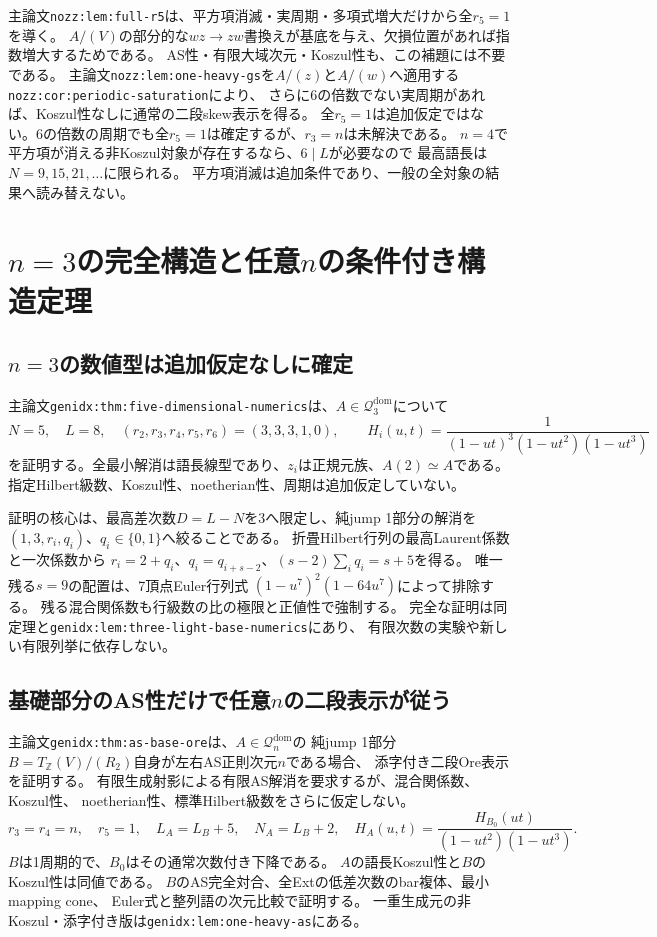 \documentclass[11pt,a4paper]{ltjsarticle}
\begin{document}
主論文\texttt{nozz:lem:full-r5}は、平方項消滅・実周期・多項式増大だけから全$r_5=1$を導く。
$A/(V)$の部分的な$wz\to zw$書換えが基底を与え、欠損位置があれば指数増大するためである。
AS性・有限大域次元・Koszul性も、この補題には不要である。
主論文\texttt{nozz:lem:one-heavy-gs}を$A/(z)$と$A/(w)$へ適用する
\texttt{nozz:cor:periodic-saturation}により、
さらに6の倍数でない実周期があれば、Koszul性なしに通常の二段skew表示を得る。
全$r_5=1$は追加仮定ではない。6の倍数の周期でも全$r_5=1$は確定するが、$r_3=n$は未解決である。
$n=4$で平方項が消える非Koszul対象が存在するなら、$6\mid L$が必要なので
最高語長は$N=9,15,21,\ldots$に限られる。
平方項消滅は追加条件であり、一般の全対象の結果へ読み替えない。

\section{\texorpdfstring{$n=3$}{n=3}の完全構造と任意\texorpdfstring{$n$}{n}の条件付き構造定理}
\subsection{\texorpdfstring{$n=3$}{n=3}の数値型は追加仮定なしに確定}
主論文\texttt{genidx:thm:five-dimensional-numerics}は、$A\in\mathcal Q_3^{\mathrm{dom}}$について
\[
N=5,\quad L=8,\quad (r_2,r_3,r_4,r_5,r_6)=(3,3,3,1,0),
\qquad H_i(u,t)=\frac1{(1-ut)^3(1-ut^2)(1-ut^3)}
\]
を証明する。全最小解消は語長線型であり、$z_i$は正規元族、$A(2)\simeq A$である。
指定Hilbert級数、Koszul性、noetherian性、周期は追加仮定していない。

証明の核心は、最高差次数$D=L-N$を3へ限定し、純jump 1部分の解消を
$(1,3,r_i,q_i)$、$q_i\in\{0,1\}$へ絞ることである。
折畳Hilbert行列の最高Laurent係数と一次係数から
$r_i=2+q_i$、$q_i=q_{i+s-2}$、$(s-2)\sum_iq_i=s+5$を得る。
唯一残る$s=9$の配置は、7頂点Euler行列式
$(1-u^7)^2(1-64u^7)$によって排除する。
残る混合関係数も行級数の比の極限と正値性で強制する。
完全な証明は同定理と\texttt{genidx:lem:three-light-base-numerics}にあり、
有限次数の実験や新しい有限列挙に依存しない。

\subsection{基礎部分のAS性だけで任意\texorpdfstring{$n$}{n}の二段表示が従う}
主論文\texttt{genidx:thm:as-base-ore}は、$A\in\mathcal Q_n^{\mathrm{dom}}$の
純jump 1部分$B=T_{\mathbb Z}(V)/(R_2)$自身が左右AS正則次元$n$である場合、
添字付き二段Ore表示を証明する。
有限生成射影による有限AS解消を要求するが、混合関係数、Koszul性、
noetherian性、標準Hilbert級数をさらに仮定しない。
\[
r_3=r_4=n,\quad r_5=1,\quad
L_A=L_B+5,\quad N_A=L_B+2,\quad
H_A(u,t)=\frac{H_{B_0}(ut)}{(1-ut^2)(1-ut^3)}.
\]
$B$は1周期的で、$B_0$はその通常次数付き下降である。
$A$の語長Koszul性と$B$のKoszul性は同値である。
$B$のAS完全対合、全Extの低差次数のbar複体、最小mapping cone、
Euler式と整列語の次元比較で証明する。
一重生成元の非Koszul・添字付き版は\texttt{genidx:lem:one-heavy-as}にある。
\end{document}
